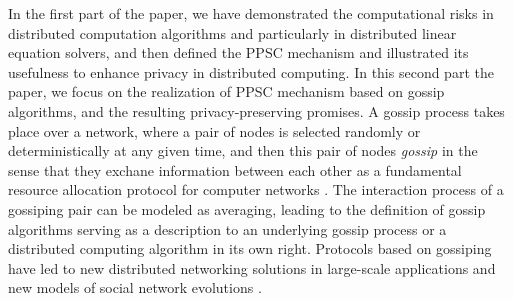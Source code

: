 \documentclass[a4paper, 11pt]{article}
\newcommand{\1}{\mathbf{1}}
\begin{document}
In the first part of the paper, we have demonstrated the computational risks in distributed computation  algorithms and particularly in distributed linear equation solvers, and then defined the  
PPSC mechanism and illustrated its usefulness to enhance privacy in distributed computing. In this second part the paper, we focus on  the realization of PPSC mechanism  based on gossip algorithms, and the resulting privacy-preserving promises. A gossip process takes place over a network, where  a  pair of nodes is selected randomly or deterministically at any given time, and then this pair of nodes {\em gossip} in the sense that they exchane  information between each other as  a fundamental resource allocation protocol for computer networks \cite{Demers1987,Kempe2004}. The interaction process of a gossiping pair can be modeled as averaging, leading to  the definition of gossip algorithms \cite{kempe2003} serving as a description to an underlying gossip process or a distributed computing algorithm in its own right. Protocols based on gossiping have led to new distributed networking solutions in large-scale applications \cite{shah2008,boyd2006randomized,nicolas2016} and new models of social network evolutions \cite{doerr-2012}. 
\end{document}
